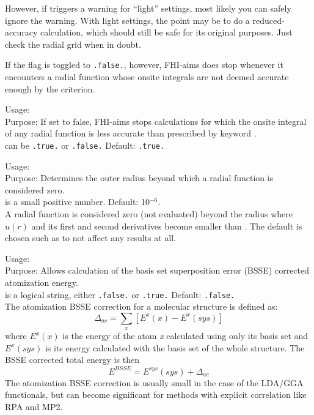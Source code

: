 However, if 
triggers a warning for ``light'' settings, most likely you can safely
ignore the warning. With light settings, the point may be to do a
reduced-accuracy calculation, which should still be safe for its
original purposes. Just check the radial grid when in doubt.

If the flag  is toggled to
\texttt{.false.}, however, FHI-aims does stop whenever it encounters a
radial function whose onsite integrals are not deemed accurate enough
by the  criterion.

{
  \noindent
  Usage:   \\[1.0ex]
  Purpose: If set to false, FHI-aims stops calculations for which the
    onsite integral of any radial function is less accurate than
    prescribed by keyword . \\[1.0ex]
   can be \texttt{.true.} or \texttt{.false.} Default: \texttt{.true.} \\
}

{
  \noindent
  Usage:   \\[1.0ex]
  Purpose: Determines the outer radius beyond which a radial function
  is considered zero. \\[1.0ex]
   is a small positive number. Default: 10$^{-6}$. \\
}
A radial function is considered zero (not evaluated) beyond the radius
where $u(r)$ and its first and second derivatives become smaller than
. The default is chosen such as to not affect any
results at all.

{\noindent
  Usage:   \\[1.0ex]
  Purpose: Allows calculation of the basis set superposition error (BSSE) corrected atomization energy.
  \\[1.0ex]
   is a logical string, either \texttt{.false.} or
    \texttt{.true.} Default: \texttt{.false.}  \\
}
The atomization BSSE correction for a molecular structure is defined as:
\begin{equation}
  \Delta_{ac}=\sum_x[E^x(x)-E^x(sys)]
\end{equation}
where $E^x(x)$ is the energy of the atom \textit{x} calculated using only its basis set and $E^x(sys)$ is its energy calculated with the basis set of the whole structure. The BSSE corrected total energy is then
\begin{equation}
  E^{BSSE}=E^{sys}(sys)+\Delta_{ac}
\end{equation}
The atomization BSSE correction is usually small in the case of the LDA/GGA functionals, but can become significant for methods with explicit correlation like RPA and MP2.

